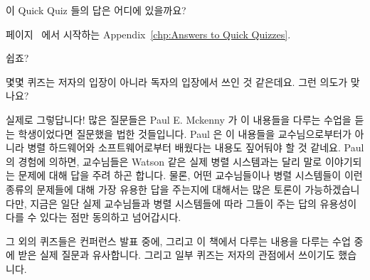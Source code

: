 \QuickQ{}
	이 Quick Quiz 들의 답은 어디에 있을까요?

\QuickA{}
	페이지~\pageref{chp:Answers to Quick Quizzes} 에서 시작하는
	Appendix~\ref{chp:Answers to Quick Quizzes}.

	쉽죠?

\QuickQ{}
	몇몇 퀴즈는 저자의 입장이 아니라 독자의 입장에서 쓰인 것 같은데요.
	그런 의도가 맞나요?

\QuickA{}
	실제로 그렇답니다!  많은 질문들은 Paul E. Mckenny 가 이 내용들을 다루는
	수업을 듣는 학생이었다면 질문했을 법한 것들입니다.  Paul 은 이 내용들을
	교수님으로부터가 아니라 병렬 하드웨어와 소프트웨어로부터 배웠다는
	내용도 짚어둬야 할 것 같네요.  Paul 의 경험에 의하면, 교수님들은 Watson
	같은 실제 병렬 시스템과는 달리 말로 이야기되는 문제에 대해 답을 주려
	하곤 합니다.  물론, 어떤 교수님들이나 병렬 시스템들이 이런 종류의
	문제들에 대해 가장 유용한 답을 주는지에 대해서는 많은 토론이
	가능하겠습니다만, 지금은 일단 실제 교수님들과 병렬 시스템들에 따라
	그들이 주는 답의 유용성이 다를 수 있다는 점만 동의하고 넘어갑시다.

	그 외의 퀴즈들은 컨퍼런스 발표 중에, 그리고 이 책에서 다루는 내용을
	다루는 수업 중에 받은 실제 질문과 유사합니다.
	그리고 일부 퀴즈는 저자의 관점에서 쓰이기도 했습니다.

